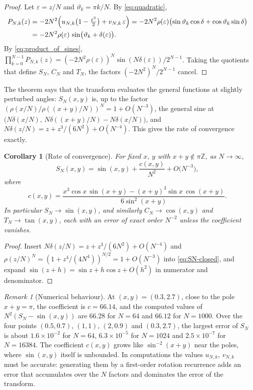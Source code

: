 \documentclass[11pt]{amsart}
\newtheorem{cor}[thm]{Corollary}
\theoremstyle{definition}
\theoremstyle{remark}
\newtheorem{rem}[thm]{Remark}
\numberwithin{equation}{section}
\begin{document}
\begin{proof}
Let $\varepsilon = z/N$ and $\vartheta_k = \pi k/N$. By \eqref{eq:quadratic},
\begin{align*}
P_{N,k}(z) &= -2N^2\Bigl(u_{N,k}\bigl(1 - \tfrac{\varepsilon^2}{2}\bigr) + v_{N,k}\,\varepsilon\Bigr)
= -2N^2\rho(\varepsilon)\bigl(\sin\vartheta_k\cos\delta + \cos\vartheta_k\sin\delta\bigr) \\
&= -2N^2\rho(\varepsilon)\,\sin\bigl(\vartheta_k + \delta(\varepsilon)\bigr).
\end{align*}
By \eqref{eq:product_of_sines},
$\prod_{k=0}^{N-1} P_{N,k}(z) = (-2N^2\rho(\varepsilon))^N\sin(N\delta(\varepsilon))/2^{N-1}$.
Taking the quotients that define $S_N$, $C_N$ and $T_N$, the factors
$(-2N^2)^N/2^{N-1}$ cancel.
\end{proof}

The theorem says that the transform evaluates the general functions at
slightly perturbed angles: $S_N(x,y)$ is, up to the factor
$(\rho(x/N)/\rho((x+y)/N))^N = 1 + O(N^{-3})$, the general sine at
$\bigl(N\delta(x/N),\, N\delta((x+y)/N) - N\delta(x/N)\bigr)$, and
$N\delta(z/N) = z + z^3/(6N^2) + O(N^{-4})$. This gives the rate of
convergence exactly.

\begin{cor}[Rate of convergence]
\label{cor:GST-rate}
For fixed $x$, $y$ with $x + y \notin \pi\mathbb{Z}$, as $N \to \infty$,
\[
S_N(x,y) = \sin(x,y) + \frac{c(x,y)}{N^2} + O\bigl(N^{-3}\bigr),
\]
where
\[
c(x,y) = \frac{x^3\cos x\,\sin(x+y) - (x+y)^3\sin x\,\cos(x+y)}{6\sin^2(x+y)} .
\]
In particular $S_N \to \sin(x,y)$, and similarly $C_N \to \cos(x,y)$ and
$T_N \to \tan(x,y)$, each with an error of exact order $N^{-2}$ unless the
coefficient vanishes.
\end{cor}

\begin{proof}
Insert $N\delta(z/N) = z + z^3/(6N^2) + O(N^{-4})$ and
$\rho(z/N)^N = (1 + z^4/(4N^4))^{N/2} = 1 + O(N^{-3})$ into
\eqref{eq:SN-closed}, and expand $\sin(z + h) = \sin z + h\cos z + O(h^2)$ in
numerator and denominator.
\end{proof}

\begin{rem}[Numerical behaviour]
\label{rem:accuracy}
At $(x,y) = (0.3,2.7)$, close to the pole $x+y = \pi$, the coefficient is
$c = 66.14$, and the computed values of $N^2(S_N - \sin(x,y))$ are $66.28$
for $N = 64$ and $66.12$ for $N = 1000$. Over the four points
$(0.5,0.7)$, $(1,1)$, $(2,0.9)$ and $(0.3,2.7)$, the largest error of $S_N$
is about $1.6\times10^{-2}$ for $N = 64$, $6.3\times10^{-5}$ for $N = 1024$
and $2.5\times10^{-7}$ for $N = 16384$. The coefficient $c(x,y)$ grows like
$\sin^{-2}(x+y)$ near the poles, where $\sin(x,y)$ itself is unbounded. In
computations the values $u_{N,k}$, $v_{N,k}$ must be accurate: generating
them by a first-order rotation recurrence adds an error that accumulates
over the $N$ factors and dominates the error of the transform.
\end{rem}
\end{document}
